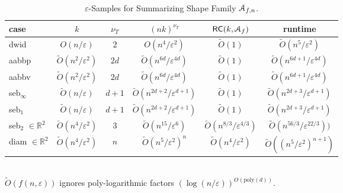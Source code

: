 \documentclass{journal}
\newcommand{\eps}{\varepsilon}
\newcommand{\Eu}[1]{\ensuremath{\EuScript{#1}}}
\newcommand{\R}{\ensuremath{\mathbb{R}}}
\begin{document}
       \begin{table}[h!!t]
      \caption{$\eps$-Samples for Summarizing Shape Family $\Eu{A}_{f,n}$.}
      \small
      \centering
      \begin{tabular}{|l|c|c|c|c|c|}
      \hline
      case & $k$ & $\nu_T$ & $(n k)^{\nu_T}$ & $\textsf{RC}(k,\Eu A_f)$ & runtime
      \\ \hline \hline
      \textsf{dwid} & $O(n/\eps)$ & $2$ & $O(n^4/\eps^2)$ & $\tilde{O}(1)$ & $\tilde{O}(n^5/\eps^2)$
      \\ \hline
      \textsf{aabbp} & $\tilde{O}(n^2/\eps^2)$ & $2d$ & $\tilde{O}(n^{6d}/\eps^{4d})$ & $\tilde{O}(1)$ & $\tilde{O}(n^{6d+1}/\eps^{4d})$
      \\ \hline
      \textsf{aabbv} & $\tilde{O}(n^2/\eps^2)$ & $2d$ & $\tilde{O}(n^{6d}/\eps^{4d})$ & $\tilde{O}(1)$ & $\tilde{O}(n^{6d+1}/\eps^{4d})$
      \\ \hline
      \textsf{seb$_\infty$} & $\tilde{O}(n/\eps)$ & $d+1$ & $\tilde{O}(n^{2d+2}/\eps^{d+1})$ & $\tilde{O}(1)$ & $\tilde{O}(n^{2d+3}/\eps^{d+1})$
      \\ \hline
      \textsf{seb$_1$} & $\tilde{O}(n/\eps)$ & $d+1$ & $\tilde{O}(n^{2d+2}/\eps^{d+1})$ & $\tilde{O}(1)$ & $\tilde{O}(n^{2d+3}/\eps^{d+1})$
      \\ \hline
      \textsf{seb$_2$} $\in \R^2$ & $\tilde{O}(n^4/\eps^2)$ & $3$ & \hspace{-.06in}$\tilde{O}(n^{15} / \eps^6)$ & $\tilde{O}(n^{8/3}/\eps^{4/3})$ & $\tilde{O}(n^{56/3}/\eps^{22/3}))$
      \\ \hline
      \textsf{diam} $\in \R^2$ & $\tilde{O}(n^4/\eps^2)$  & $n$ & $\tilde{O}(n^5/\eps^2)^n$ & $\tilde{O}(n^4 / \eps^2)$ & $\tilde{O}((n^5/\eps^2)^{n+1})$
      \\ \hline
     \end{tabular}
      \label{tbl:Afn-size}
      \\  $\tilde{O}(f(n,\eps))$ ignores poly-logarithmic factors $(\log (n/\eps))^{O(\textrm{poly}(d))}$.
      \end{table}
\end{document}
